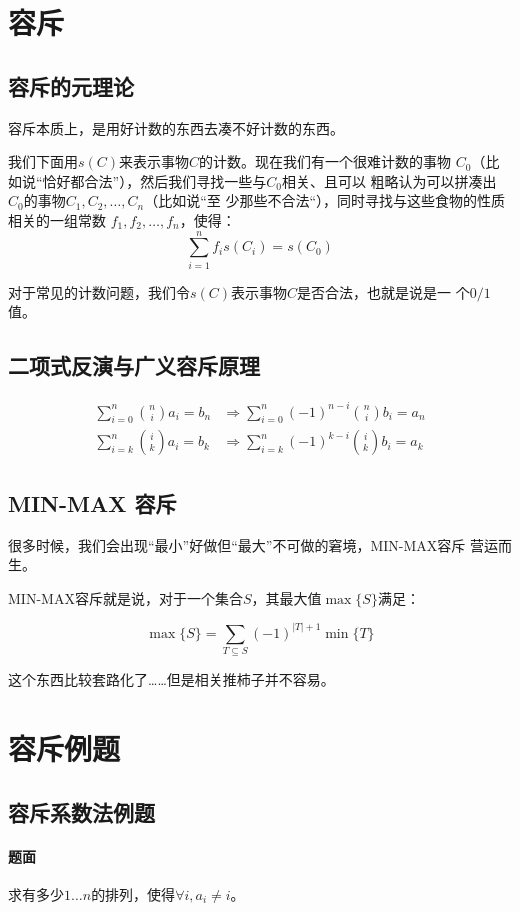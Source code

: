 \section{容斥}
\subsection{容斥的元理论}
容斥本质上，是用好计数的东西去凑不好计数的东西。\par
我们下面用$s(C)$来表示事物$C$的计数。现在我们有一个很难计数的事物
$C_0$（比如说“恰好都合法”），然后我们寻找一些与$C_0$相关、且可以
粗略认为可以拼凑出$C_0$的事物$C_1, C_2, \ldots, C_n$（比如说“至
少那些不合法“），同时寻找与这些食物的性质相关的一组常数
$f_1, f_2, \ldots, f_n$，使得：
\[\sum_{i = 1}^n f_i s(C_i) = s(C_0)\]\par
对于常见的计数问题，我们令$s(C)$表示事物$C$是否合法，也就是说是一
个$0/1$值。
\subsection{二项式反演与广义容斥原理}
\[
\begin{aligned}
\sum_{i = 0}^n\binom n i a_i = b_n&\Longrightarrow
\sum_{i = 0}^n(-1)^{n - i}\binom n i b_i = a_n\\
\sum_{i = k}^n\binom i k a_i = b_k&\Longrightarrow
\sum_{i = k}^n(-1)^{k - i}\binom i k b_i = a_k
\end{aligned}
\]
\subsection{MIN-MAX 容斥}
很多时候，我们会出现“最小”好做但“最大”不可做的窘境，MIN-MAX容斥
营运而生。\par
MIN-MAX容斥就是说，对于一个集合$S$，其最大值$\max\{S\}$满足：\par
\[\max\{S\} = \sum_{T\subseteq S} (-1)^{|T| + 1}\min\{T\}\]\par
这个东西比较套路化了……但是相关推柿子并不容易。

\section{容斥例题}
\subsection{容斥系数法例题}
\paragraph{题面}
求有多少\(1\ldots n\)的排列，使得\(\forall i, a_i\ne i\)。

